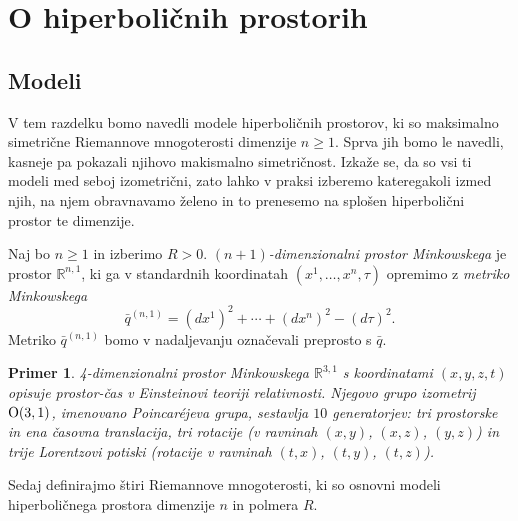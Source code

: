 \documentclass[a4paper]{article}
\newtheorem{primer}{Primer}
\begin{document}
\section{O hiperboličnih prostorih}
\subsection{Modeli}

V tem razdelku bomo navedli modele hiperboličnih prostorov, ki so maksimalno simetrične Riemannove mnogoterosti dimenzije $n \geq 1$. Sprva jih bomo le navedli, kasneje pa pokazali njihovo makismalno simetričnost. Izkaže se, da so vsi ti modeli med seboj izometrični, zato lahko v praksi izberemo kateregakoli izmed njih, na njem obravnavamo želeno in to prenesemo na splošen hiperbolični prostor te dimenzije.

Naj bo $n \geq 1$ in izberimo $R>0$.
\emph{$(n+1)$-dimenzionalni prostor Minkowskega} je prostor $\mathbb{R}^{n,1}$, ki ga v standardnih koordinatah $(x^{1}, \dots , x^{n}, \tau)$ opremimo z \emph{metriko Minkowskega}
\begin{equation}\label{eq:Mink metrika}
\bar{q}^{(n,1)} = (dx^{1})^2 + \cdots + (dx^{n})^2 - (d\tau)^2.
\end{equation}
Metriko $\bar{q}^{(n,1)}$ bomo v nadaljevanju označevali preprosto s $\bar{q}$.

\begin{primer}
4-dimenzionalni prostor Minkowskega $\mathbb{R}^{3,1}$ s koordinatami $(x,y,z,t)$ opisuje prostor-čas v Einsteinovi teoriji relativnosti. Njegovo grupo izometrij $\textup{O}(3,1)$, imenovano \emph{Poincar\'ejeva grupa}, sestavlja $10$ generatorjev: tri prostorske in ena časovna translacija, tri rotacije (v ravninah $(x,y)$, $(x,z)$, $(y,z)$) in trije Lorentzovi potiski (rotacije v ravninah $(t,x)$, $(t,y)$, $(t,z)$).
\end{primer}

Sedaj definirajmo štiri Riemannove mnogoterosti, ki so osnovni modeli hiperboličnega prostora dimenzije $n$ in polmera $R$.
\end{document}
